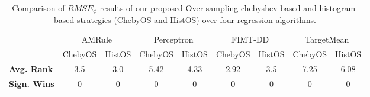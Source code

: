     \begin{table}[!htb]
        \centering
        \caption{Comparison of $RMSE_{\phi}$ results of our proposed Over-sampling chebyshev-based and histogram-based strategies (ChebyOS and HistOS) over four regression algorithms.}
        \label{tab:Sum_ChebyOS_HistOS_phi_Over}
        \begin{tabular}{ |l|c|c|c|c|c|c|c|c|}
        \hline
            \multirow{2}{4em}{ }&
            \multicolumn{2}{|c|}{AMRule} &
            \multicolumn{2}{|c|}{Perceptron} &
            \multicolumn{2}{|c|}{FIMT-DD} &
            \multicolumn{2}{|c|}{TargetMean}
        \\
        \cline{2-9}
        & ChebyOS & HistOS & ChebyOS & HistOS & ChebyOS & HistOS &
        ChebyOS & HistOS \\
        \hline
        {\bf Avg. Rank} & 3.5 & 3.0 & 5.42 & 4.33 & 2.92 & 3.5 & 7.25 & 6.08 \\
        \hline
        {\bf Sign. Wins} & 0 & 0 & 0 & 0 & 0 & 0 & 0 & 0 \\
        \hline
        \end{tabular}
    \end{table}